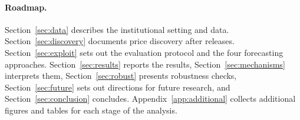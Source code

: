 \paragraph{Roadmap.}
Section~\ref{sec:data} describes the institutional setting and data.
Section~\ref{sec:discovery} documents price discovery after releases.
Section~\ref{sec:exploit} sets out the evaluation protocol and the four forecasting approaches.
Section~\ref{sec:results} reports the results, Section~\ref{sec:mechanisms} interprets them,
Section~\ref{sec:robust} presents robustness checks, Section~\ref{sec:future} sets out directions for future research, and Section~\ref{sec:conclusion} concludes.
Appendix~\ref{app:additional} collects additional figures and tables for each stage of the analysis.
